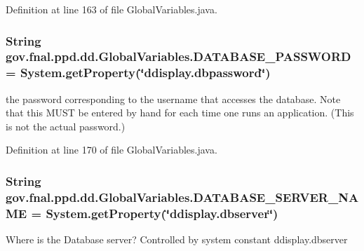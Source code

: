 Definition at line 163 of file Global\-Variables.\-java.

\hypertarget{classgov_1_1fnal_1_1ppd_1_1dd_1_1GlobalVariables_ae63bd973c9c02683b0c4964179ceefe0}{
\subsubsection[{D\-A\-T\-A\-B\-A\-S\-E\-\_\-\-P\-A\-S\-S\-W\-O\-R\-D}]{\setlength{\rightskip}{0pt plus 5cm}String gov.\-fnal.\-ppd.\-dd.\-Global\-Variables.\-D\-A\-T\-A\-B\-A\-S\-E\-\_\-\-P\-A\-S\-S\-W\-O\-R\-D = System.\-get\-Property(\char`\"{}ddisplay.\-dbpassword\char`\"{})\hspace{0.3cm}{\ttfamily [static]}}}\label{classgov_1_1fnal_1_1ppd_1_1dd_1_1GlobalVariables_ae63bd973c9c02683b0c4964179ceefe0}
the password corresponding to the username that accesses the database. Note that this M\-U\-S\-T be entered by hand for each time one runs an application. (This is not the actual password.) 

Definition at line 170 of file Global\-Variables.\-java.

\hypertarget{classgov_1_1fnal_1_1ppd_1_1dd_1_1GlobalVariables_a84bb07dcee9c961579282f50a5031c0e}{
\subsubsection[{D\-A\-T\-A\-B\-A\-S\-E\-\_\-\-S\-E\-R\-V\-E\-R\-\_\-\-N\-A\-M\-E}]{\setlength{\rightskip}{0pt plus 5cm}String gov.\-fnal.\-ppd.\-dd.\-Global\-Variables.\-D\-A\-T\-A\-B\-A\-S\-E\-\_\-\-S\-E\-R\-V\-E\-R\-\_\-\-N\-A\-M\-E = System.\-get\-Property(\char`\"{}ddisplay.\-dbserver\char`\"{})\hspace{0.3cm}{\ttfamily [static]}}}\label{classgov_1_1fnal_1_1ppd_1_1dd_1_1GlobalVariables_a84bb07dcee9c961579282f50a5031c0e}
Where is the Database server? Controlled by system constant ddisplay.\-dbserver 

